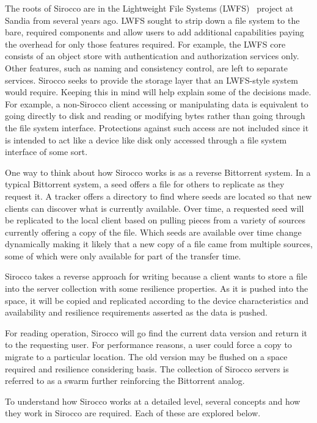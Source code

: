 The roots of Sirocco are in the Lightweight File Systems
(LWFS)~\cite{oldfield:2006:lwfs} project at Sandia from several years ago. LWFS
sought to strip down a file system to the bare, required components and allow
users to add additional capabilities paying the overhead for only those
features required. For example, the LWFS core consists of an object store with
authentication and authorization services only. Other features, such as naming
and consistency control, are left to separate services. Sirocco seeks to
provide the storage layer that an LWFS-style system would require. Keeping this
in mind will help explain some of the decisions made. For example, a
non-Sirocco client accessing or manipulating data is equivalent to going
directly to disk and reading or modifying bytes rather than going through the
file system interface. Protections against such access are not included since
it is intended to act like a device like disk only accessed through a file
system interface of some sort.

One way to think about how Sirocco works is as a reverse Bittorrent system. In
a typical Bittorrent system, a seed offers a file for others to replicate as
they request it. A tracker offers a directory to find where seeds are located
so that new clients can discover what is currently available. Over time, a
requested seed will be replicated to the local client based on pulling pieces
from a variety of sources currently offering a copy of the file. Which seeds
are available over time change dynamically making it likely that a new copy of
a file came from multiple sources, some of which were only available for part
of the transfer time.

Sirocco takes a reverse approach for writing because a client wants to store a
file into the server collection with some resilience properties. As it is
pushed into the space, it will be copied and replicated according to the device
characteristics and availability and resilience requirements asserted as the
data is pushed.

For reading operation, Sirocco will go find the current data version and return
it to the requesting user. For performance reasons, a user could force a copy
to migrate to a particular location. The old version may be flushed on a space
required and resilience considering basis. The collection of Sirocco servers is
referred to as a swarm further reinforcing the Bittorrent analog.

To understand how Sirocco works at a detailed level, several concepts and how
they work in Sirocco are required. Each of these are explored below.


